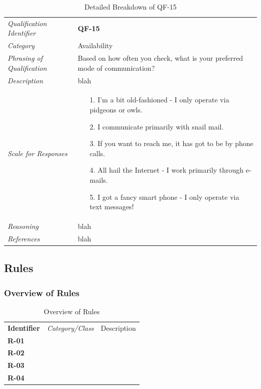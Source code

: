 \documentclass[12pt,letterpaper]{article}
\begin{document}
\begin{table}[H]
	\caption{Detailed Breakdown of QF-15}
	\begin{tabu} to 
		\toprule
		Qualification Identifier & {\bf QF-15}\\
		Category & Availability \\
		Phrasing of Qualification & Based on how often you check, what is your preferred mode of communication? \\
		Description & blah\\
		Scale for Responses &
		\begin{minipage}[t]{\linewidth}
			\begin{enumerate}
				\item[1.] I'm a bit old-fashioned - I only operate via pidgeons or owls.
				\item[2.] I communicate primarily with snail mail.
				\item[3.] If you want to reach me, it has got to be by phone calls.
				\item[4.] All hail the Internet - I work primarily through e-mails.
				\item[5.] I got a fancy smart phone - I only operate via text messages!
			\end{enumerate}
		\end{minipage}\\
		Reasoning & blah\\
		References & blah\\
		\toprule
	\end{tabu}
\end{table}

\subsection{Rules}
\subsubsection{Overview of Rules}

\begin{table}[H]
	\caption{Overview of Rules}
	\begin{tabu} to 
	    \tableheader{}Identifier & Category/Class & Description\\
		R-01 &  & \\
		R-02 &  & \\
		R-03 &  & \\
		R-04 &  & \\
	\end{tabu}
\end{table}
\end{document}
